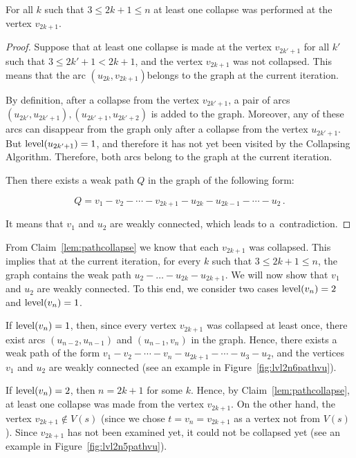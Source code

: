 \begin{claim}
\label{lem:pathcollapse}
For all $ k $ such that $ 3 \le 2k + 1 \le n $ at least one collapse was performed at the vertex $ v_{2k + 1} $.
\end{claim}
\begin{proof}
Suppose that at least one collapse is made at the vertex $ v_{2k '+ 1} $ for all $ k' $ such that $ 3 \le 2k '+ 1 <2k + 1 $, and the vertex $ v_{2k + 1} $ was not collapsed. This means that the arc $ (u_{2k}, v_{2k + 1}) $belongs to the graph at the current iteration.

By definition, after a collapse from the vertex $ v_{2k '+ 1} $, a pair of arcs $ (u_{2k'}, u_{2k '+ 1}), (u_{2k' + 1}, u_{2k '+ 2}) $ is added to the graph. Moreover, any of these arcs can disappear from the graph only after a collapse from the vertex $ u_ {2k '+ 1} $. But $\operatorname{level}(u_ {2k '+ 1})= 1 $, and therefore it has not yet been visited by the Collapsing Algorithm. Therefore, both arcs belong to the graph at the current iteration.

Then there exists a weak path $ Q $ in the graph of the following form:

$$
Q = v_1 - v_2 - \dotsb - v_{2k+1} - u_{2k} - u_{2k-1} - \dotsb - u_2 \, .
$$

It means that $v_1$ and $u_2$ are weakly connected, which leads to a~contradiction.
\end{proof}

From Claim~\ref{lem:pathcollapse} we know that each $v_{2k+1}$ was collapsed. This implies that at the current iteration, for every $k$ such that $3\le 2k+1\le n$, the graph contains the weak path $ u_2 - \ldots - u_{2k} - u_{2k + 1} $. We will now show that $v_1$ and $u_2$ are weakly connected. To this end, we consider two cases $ \operatorname{level} (v_{n}) = 2 $ and $ \operatorname{level} (v_{n}) = 1 $. 

If $ \operatorname{level} (v_{n}) = 1 $, then, since every vertex $ v_{2k + 1} $ was collapsed at least once, there exist arcs $(u_{n-2},u_{n-1} ) $ and $ (u_{n-1}, v_n) $ in the graph. Hence, there exists a weak path of the form $ v_1 - v_2 - \dotsb - v_n - u_{2k + 1} - \dotsb - u_3 - u_2 $, and the vertices $ v_1 $ and $ u_2 $ are weakly connected (see an example in Figure~\ref{fig:lvl2n6pathvu}).

If $ \operatorname{level} (v_{n}) = 2 $, then $ n = 2k + 1 $ for some $ k $. Hence, by Claim~\ref{lem:pathcollapse}, at least one collapse was made from the vertex $ v_{2k + 1} $. On the other hand, the vertex $ v_{2k + 1} \notin V (s) $ (since we chose $t=v_n=v_{2k+1}$ as a vertex not from $V(s)$). Since $v_{2k+1}$ has not been examined yet, it could not be collapsed yet (see an example in Figure~\ref{fig:lvl2n5pathvu}).

